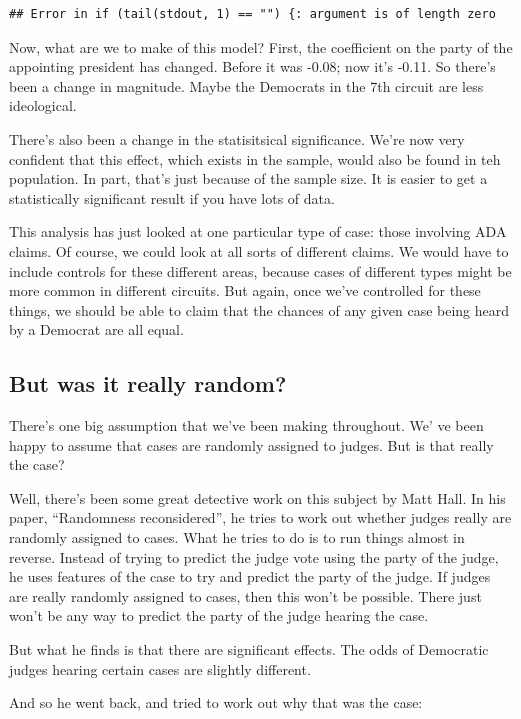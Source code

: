 \documentclass[12pt,twoside]{article}
\begin{document}
\begin{verbatim}
## Error in if (tail(stdout, 1) == "") {: argument is of length zero
\end{verbatim}

Now, what are we to make of this model? First, the coefficient on the
party of the appointing president has changed. Before it was -0.08; now
it's -0.11. So there's been a change in magnitude. Maybe the Democrats
in the 7th circuit are less ideological.

There's also been a change in the statisitsical significance. We're now
very confident that this effect, which exists in the sample, would also
be found in teh population. In part, that's just because of the sample
size. It is easier to get a statistically significant result if you have
lots of data.

This analysis has just looked at one particular type of case: those
involving ADA claims. Of course, we could look at all sorts of different
claims. We would have to include controls for these different areas,
because cases of different types might be more common in different
circuits. But again, once we've controlled for these things, we should
be able to claim that the chances of any given case being heard by a
Democrat are all equal.

\subsection{But was it really random?}\label{but-was-it-really-random}

There's one big assumption that we've been making throughout. We' ve
been happy to assume that cases are randomly assigned to judges. But is
that really the case?

Well, there's been some great detective work on this subject by Matt
Hall. In his paper, ``Randomness reconsidered'', he tries to work out
whether judges really are randomly assigned to cases. What he tries to
do is to run things almost in reverse. Instead of trying to predict the
judge vote using the party of the judge, he uses features of the case to
try and predict the party of the judge. If judges are really randomly
assigned to cases, then this won't be possible. There just won't be any
way to predict the party of the judge hearing the case.

But what he finds is that there are significant effects. The odds of
Democratic judges hearing certain cases are slightly different.

And so he went back, and tried to work out why that was the case:
\end{document}
